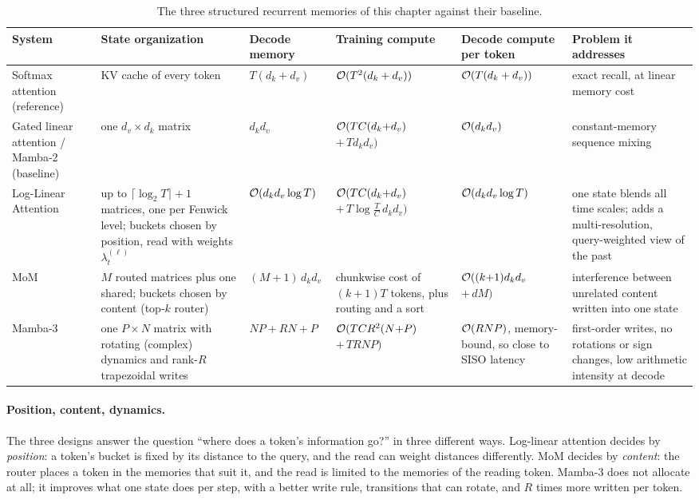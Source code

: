 \begin{table}[t]
\centering\footnotesize
\caption{The three structured recurrent memories of this chapter against their baseline.}
\label{tab:c07-compare}
\begin{tabularx}{\textwidth}{@{}>{\raggedright\arraybackslash}p{1.75cm} >{\raggedright\arraybackslash}X >{\raggedright\arraybackslash}p{2.0cm} >{\raggedright\arraybackslash}p{2.35cm} >{\raggedright\arraybackslash}p{1.98cm} >{\raggedright\arraybackslash}X@{}}
\toprule
System & State organization & Decode memory & Training compute & Decode compute per token & Problem it addresses \\
\midrule
Softmax attention (reference) & KV cache of every token & $T(d_k+d_v)$ & $\mathcal{O}(T^2(d_k+d_v))$ & $\mathcal{O}(T(d_k+d_v))$ & exact recall, at linear memory cost \\
Gated linear attention / Mamba-2 (baseline) & one $d_v\times d_k$ matrix & $d_kd_v$ & $\mathcal{O}(TC(d_k{+}d_v)$ $+\,Td_kd_v)$ & $\mathcal{O}(d_kd_v)$ & constant-memory sequence mixing \\
\addlinespace
Log-Linear Attention & up to $\lceil\log_2T\rceil{+}1$ matrices, one per Fenwick level; buckets chosen by position, read with weights $\lambda_t^{(\ell)}$ & $\mathcal{O}(d_kd_v\log T)$ & $\mathcal{O}(TC(d_k{+}d_v)$ $+\,T\log\tfrac{T}{C}\,d_kd_v)$ & $\mathcal{O}(d_kd_v\log T)$ & one state blends all time scales; adds a multi-resolution, query-weighted view of the past \\
\addlinespace
MoM & $M$ routed matrices plus one shared; buckets chosen by content (top-$k$ router) & $(M{+}1)\,d_kd_v$ & chunkwise cost of $(k{+}1)T$ tokens, plus routing and a sort & $\mathcal{O}((k{+}1)d_kd_v$ $+\,dM)$ & interference between unrelated content written into one state \\
\addlinespace
Mamba-3 & one $P\times N$ matrix with rotating (complex) dynamics and rank-$R$ trapezoidal writes & $NP + RN + P$ & $\mathcal{O}(TCR^2(N{+}P)$ $+\,TRNP)$ & $\mathcal{O}(RNP)$, memory-bound, so close to SISO latency & first-order writes, no rotations or sign changes, low arithmetic intensity at decode \\
\bottomrule
\end{tabularx}
\end{table}

\paragraph{Position, content, dynamics.} The three designs answer the question ``where does a
token's information go?'' in three different ways. Log-linear attention decides by
\emph{position}: a token's bucket is fixed by its distance to the query, and the read can
weight distances differently. MoM decides by \emph{content}: the router places a token in the
memories that suit it, and the read is limited to the memories of the reading token. Mamba-3
does not allocate at all; it improves what one state does per step, with a better write rule,
transitions that can rotate, and $R$ times more written per token.

